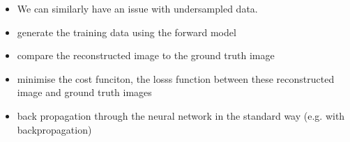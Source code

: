 \documentclass[11pt]{article}
\begin{document}
\begin{minipage}[l]{.5\linewidth}
    \begin{figure}[H]
        \centering
    \end{figure}    
\end{minipage}\hfill
\begin{minipage}[r]{.48\linewidth}
    \begin{itemize}
        \item We can similarly have an issue with undersampled data.
    \end{itemize}
\end{minipage}

\begin{figure}[H]
    \centering
\end{figure} 

\begin{minipage}[l]{.5\linewidth}
    \begin{figure}[H]
        \centering
    \end{figure}    
\end{minipage}\hfill
\begin{minipage}[r]{.48\linewidth}
    \begin{itemize}
        \item generate the training data using the forward model
        \item compare the reconstructed image to the ground truth image 
        \item minimise the cost funciton, the losss function between these reconstructed image and ground truth images
        \item back propagation through the neural network in the standard way (e.g. with backpropagation)
    \end{itemize}
\end{minipage}
\end{document}
